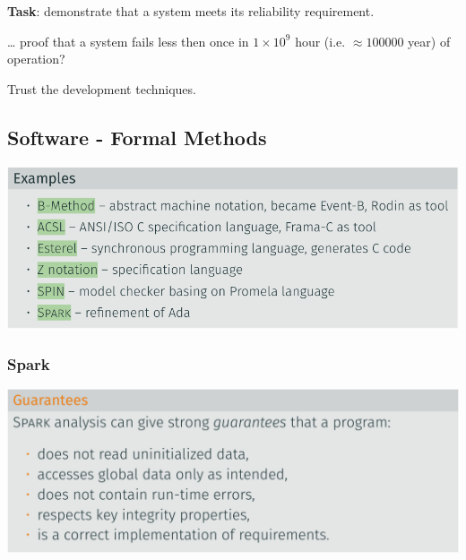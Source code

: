 \documentclass[
  10pt,
  a4paper,
]{article}
\begin{document}
\begin{multicols*}{2}
\textbf{Task}: demonstrate that a system meets its reliability
requirement.

\begin{tcolorbox}[enhanced jigsaw, coltitle=black, toprule=.15mm, colframe=quarto-callout-tip-color-frame, breakable, titlerule=0mm, title=\textcolor{quarto-callout-tip-color}{\faLightbulb}\hspace{0.5em}{How to\ldots{}}, toptitle=1mm, colback=white, leftrule=.75mm, bottomtitle=1mm, colbacktitle=quarto-callout-tip-color!10!white, left=2mm, bottomrule=.15mm, rightrule=.15mm, arc=.35mm, opacityback=0, opacitybacktitle=0.6]

\ldots{} proof that a system fails less then once in \(1\times 10^{9}\)
hour (i.e. \(\approx 100 000\) year) of operation?

{\textcolor{OliveGreen}{Trust the development techniques}}.

\end{tcolorbox}

\subsection{Software - Formal Methods}\label{software---formal-methods}

\includegraphics{images/safety/image-17.png}

\subsubsection{Spark}\label{spark}

\includegraphics{images/safety/image-19.png}


\end{multicols*}
\end{document}
